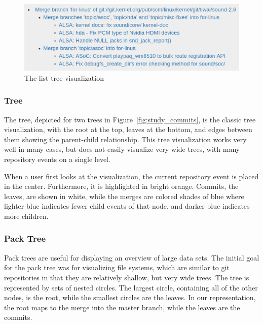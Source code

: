 \begin{figure}
        \centering
        \includegraphics[width=0.9\linewidth]{figures/linvis/linvis_list_tree.png}
        \caption{The list tree visualization}
        \label{fig:linvis_list_tree}
\end{figure}

\subsubsection{\rt Tree}

The \rt tree\cite{Reingold1981}, depicted for two trees in
Figure~\ref{fig:study_commits}, is the classic tree visualization, with
the root at the top, leaves at the bottom, and edges between them
showing the parent-child relationship. This tree visualization works
very well in many cases, but does not easily visualize very wide trees,
with many repository events on a single level.

When a user first looks at the visualization, the current repository
event is placed in the center. Furthermore, it is highlighted in bright
orange. Commits, the leaves, are shown in white, while the merges are
colored shades of blue where lighter blue indicates fewer child events
of that node, and darker blue indicates more children.

\subsubsection{Pack Tree}

Pack trees\cite{Wang2006} are useful for displaying an overview of large
data sets. The initial goal for the pack tree was for visualizing file
systems, which are similar to git repositories in that they are
relatively shallow, but very wide trees. The tree is represented by sets
of nested circles. The largest circle, containing all of the other
nodes, is the root, while the smallest circles are the leaves. In our
representation, the root maps to the merge into the master branch, while
the leaves are the commits.


